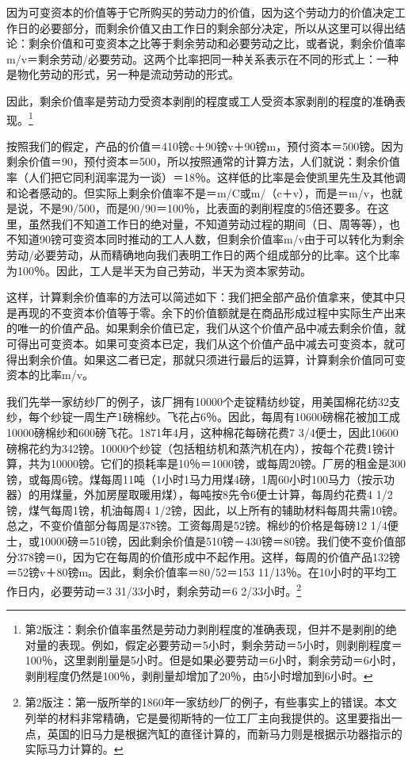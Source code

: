\documentclass{ctexbook}
\begin{document}
    因为可变资本的价值等于它所购买的劳动力的价值，因为这个劳动力的价值决定工作日的必要部分，而剩余价值又由工作日的剩余部分决定，所以从这里可以得出结论：剩余价值和可变资本之比等于剩余劳动和必要劳动之比，或者说，剩余价值率m/v＝剩余劳动/必要劳动。这两个比率把同一种关系表示在不同的形式上：一种是物化劳动的形式，另一种是流动劳动的形式。
    
    因此，剩余价值率是劳动力受资本剥削的程度或工人受资本家剥削的程度的准确表现。\footnote{第2版注：剩余价值率虽然是劳动力剥削程度的准确表现，但并不是剥削的绝对量的表现。例如，假定必要劳动＝5小时，剩余劳动＝5小时，则剥削程度＝100％，这里剥削量是5小时。但是如果必要劳动＝6小时，剩余劳动＝6小时，剥削程度仍然是100％，剥削量却增加了20％，由5小时增加到6小时。}
    
    按照我们的假定，产品的价值＝410镑c＋90镑v＋90镑m，预付资本＝500镑。因为剩余价值＝90，预付资本＝500，所以按照通常的计算方法，人们就说：剩余价值率（人们把它同利润率混为一谈）＝18％。这样低的比率是会使凯里先生及其他调和论者感动的。但实际上剩余价值率不是＝m/C或m/（c＋v），而是＝m/v，也就是说，不是90/500，而是90/90＝100％，比表面的剥削程度的5倍还要多。在这里，虽然我们不知道工作日的绝对量，不知道劳动过程的期间（日、周等等），也不知道90镑可变资本同时推动的工人人数，但剩余价值率m/v由于可以转化为剩余劳动/必要劳动，从而精确地向我们表明工作日的两个组成部分的比率。这个比率为100％。因此，工人是半天为自己劳动，半天为资本家劳动。
    
    这样，计算剩余价值率的方法可以简述如下：我们把全部产品价值拿来，使其中只是再现的不变资本价值等于零。余下的价值额就是在商品形成过程中实际生产出来的唯一的价值产品。如果剩余价值已定，我们从这个价值产品中减去剩余价值，就可得出可变资本。如果可变资本已定，我们从这个价值产品中减去可变资本，就可得出剩余价值。如果这二者已定，那就只须进行最后的运算，计算剩余价值同可变资本的比率m/v。
    
    我们先举一家纺纱厂的例子，该厂拥有10000个走锭精纺纱锭，用美国棉花纺32支纱，每个纱锭一周生产1磅棉纱。飞花占6％。因此，每周有10600磅棉花被加工成10000磅棉纱和600磅飞花。1871年4月，这种棉花每磅花费7 3/4便士，因此10600磅棉花约为342镑。10000个纱锭（包括粗纺机和蒸汽机在内），按每个花费1镑计算，共为10000镑。它们的损耗率是10％＝1000镑，或每周20镑。厂房的租金是300镑，或每周6镑。煤每周11吨（1小时1马力用煤4磅，1周60小时100马力（按示功器）的用煤量，外加房屋取暖用煤），每吨按8先令6便士计算，每周约花费4 1/2镑，煤气每周1镑，机油每周4 1/2镑，因此，以上所有的辅助材料每周共需10镑。总之，不变价值部分每周是378镑。工资每周是52镑。棉纱的价格是每磅12 1/4便士，或10000磅＝510镑，因此剩余价值是510镑－430镑＝80镑。我们使不变价值部分378镑＝0，因为它在每周的价值形成中不起作用。这样，每周的价值产品132镑＝52镑v＋80镑m。因此，剩余价值率＝80/52＝153 11/13％。在10小时的平均工作日内，必要劳动＝3 31/33小时，剩余劳动＝6 2/33小时。\footnote{第2版注：第一版所举的1860年一家纺纱厂的例子，有些事实上的错误。本文列举的材料非常精确，它是曼彻斯特的一位工厂主向我提供的。这里要指出一点，英国的旧马力是根据汽缸的直径计算的，而新马力则是根据示功器指示的实际马力计算的。}
    
\end{document}
